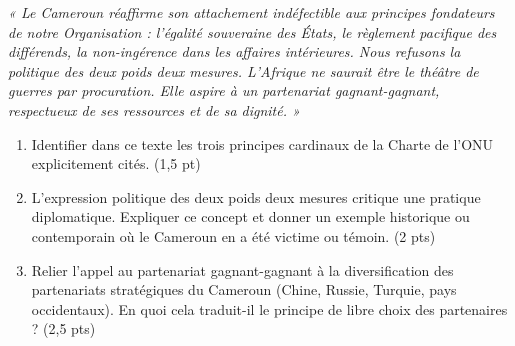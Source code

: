 \documentclass[11pt]{article}
\begin{document}
\begin{exercice}
\textit{« Le Cameroun réaffirme son attachement indéfectible aux principes fondateurs de notre Organisation : l'égalité souveraine des États, le règlement pacifique des différends, la non-ingérence dans les affaires intérieures. Nous refusons la politique des deux poids deux mesures. L'Afrique ne saurait être le théâtre de guerres par procuration. Elle aspire à un partenariat gagnant-gagnant, respectueux de ses ressources et de sa dignité. »}

\begin{enumerate}
    \item Identifier dans ce texte les trois principes cardinaux de la Charte de l'ONU explicitement cités. \hfill (1,5 pt)
    \item L'expression \og politique des deux poids deux mesures \fg{} critique une pratique diplomatique. Expliquer ce concept et donner un exemple historique ou contemporain où le Cameroun en a été victime ou témoin. \hfill (2 pts)
    \item Relier l'appel au \og partenariat gagnant-gagnant \fg{} à la diversification des partenariats stratégiques du Cameroun (Chine, Russie, Turquie, pays occidentaux). En quoi cela traduit-il le principe de \og libre choix des partenaires \fg{} ? \hfill (2,5 pts)
\end{enumerate}
\end{exercice}
\end{document}
